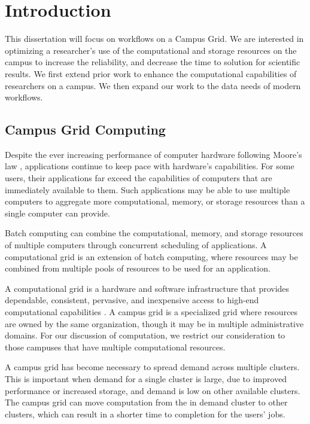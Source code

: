 \chapter{Introduction}

This dissertation will focus on workflows on a Campus Grid.  We are interested in optimizing a researcher's use of the computational and storage resources on the campus to increase the reliability, and decrease the time to solution for scientific results.  We first extend prior work to enhance the computational capabilities of researchers on a campus.  We then expand our work to the data needs of modern workflows.

\section{Campus Grid Computing}

Despite the ever increasing performance of computer hardware following Moore's law \cite{schaller1997moore}, applications continue to keep pace with hardware's capabilities.  For some users, their applications far exceed the capabilities of computers that are immediately available to them.  Such applications may be able to use multiple computers to aggregate  more computational, memory, or storage resources than a single computer can provide.

Batch computing can combine the computational, memory, and storage resources of multiple computers through concurrent scheduling of applications.  A computational grid is an extension of batch computing, where resources may be combined from multiple pools of resources to be used for an application.

A computational grid is a hardware and software infrastructure that provides dependable, consistent, pervasive, and inexpensive access to high-end computational capabilities \cite{foster2004grid}.  A campus grid is a specialized grid where resources are owned by the same organization, though it may be in multiple administrative domains.  For our discussion of computation, we restrict our consideration to those campuses that have multiple computational resources.

A campus grid has become necessary to spread demand across multiple clusters.  This is important when demand for a single cluster is large, due to improved performance or increased storage, and demand is low on other available clusters.  The campus grid can move computation from the in demand cluster to other clusters, which can result in a shorter time to completion for the users' jobs.

